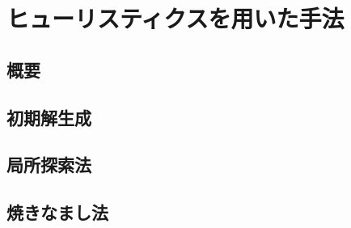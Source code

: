 \chapter{ヒューリスティクスを用いた手法} \label{chapter:4}

\section{概要}

\section{初期解生成}

\section{局所探索法}

\section{焼きなまし法}

